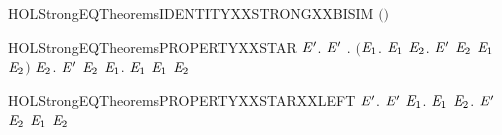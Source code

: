 \newcommand{\HOLStrongEQTheoremsEQUALXXIMPXXSTRONGXXEQUIV}{\UseVerbatim{HOLStrongEQTheoremsEQUALXXIMPXXSTRONGXXEQUIV}}
\begin{SaveVerbatim}{HOLStrongEQTheoremsIDENTITYXXSTRONGXXBISIM}
\HOLTokenTurnstile{}  \ensuremath{(}\HOLSymConst{\ensuremath{=}}\ensuremath{)}
\end{SaveVerbatim}
\newcommand{\HOLStrongEQTheoremsIDENTITYXXSTRONGXXBISIM}{\UseVerbatim{HOLStrongEQTheoremsIDENTITYXXSTRONGXXBISIM}}
\begin{SaveVerbatim}{HOLStrongEQTheoremsPROPERTYXXSTAR}
\HOLTokenTurnstile{} \HOLSymConst{\HOLTokenForall{}} \ensuremath{\HOLBoundVar{E}\sp{\prime}}.
         \ensuremath{\HOLBoundVar{E}\sp{\prime}} \HOLSymConst{\HOLTokenEquiv{}}
       \HOLSymConst{\HOLTokenForall{}}.
           \ensuremath{(}\HOLSymConst{\HOLTokenForall{}}\ensuremath{\HOLBoundVar{E}\sb{\mathrm{1}}}.  \HOLTokenTransBegin{}\HOLTokenTransEnd \ensuremath{\HOLBoundVar{E}\sb{\mathrm{1}}} \HOLSymConst{\HOLTokenImp{}} \HOLSymConst{\HOLTokenExists{}}\ensuremath{\HOLBoundVar{E}\sb{\mathrm{2}}}. \ensuremath{\HOLBoundVar{E}\sp{\prime}} \HOLTokenTransBegin{}\HOLTokenTransEnd \ensuremath{\HOLBoundVar{E}\sb{\mathrm{2}}} \HOLSymConst{\HOLTokenConj{}}  \ensuremath{\HOLBoundVar{E}\sb{\mathrm{1}}} \ensuremath{\HOLBoundVar{E}\sb{\mathrm{2}}}\ensuremath{)} \HOLSymConst{\HOLTokenConj{}}
           \HOLSymConst{\HOLTokenForall{}}\ensuremath{\HOLBoundVar{E}\sb{\mathrm{2}}}. \ensuremath{\HOLBoundVar{E}\sp{\prime}} \HOLTokenTransBegin{}\HOLTokenTransEnd \ensuremath{\HOLBoundVar{E}\sb{\mathrm{2}}} \HOLSymConst{\HOLTokenImp{}} \HOLSymConst{\HOLTokenExists{}}\ensuremath{\HOLBoundVar{E}\sb{\mathrm{1}}}.  \HOLTokenTransBegin{}\HOLTokenTransEnd \ensuremath{\HOLBoundVar{E}\sb{\mathrm{1}}} \HOLSymConst{\HOLTokenConj{}}  \ensuremath{\HOLBoundVar{E}\sb{\mathrm{1}}} \ensuremath{\HOLBoundVar{E}\sb{\mathrm{2}}}
\end{SaveVerbatim}
\newcommand{\HOLStrongEQTheoremsPROPERTYXXSTAR}{\UseVerbatim{HOLStrongEQTheoremsPROPERTYXXSTAR}}
\begin{SaveVerbatim}{HOLStrongEQTheoremsPROPERTYXXSTARXXLEFT}
\HOLTokenTurnstile{} \HOLSymConst{\HOLTokenForall{}} \ensuremath{\HOLBoundVar{E}\sp{\prime}}.
         \ensuremath{\HOLBoundVar{E}\sp{\prime}} \HOLSymConst{\HOLTokenImp{}}
       \HOLSymConst{\HOLTokenForall{}} \ensuremath{\HOLBoundVar{E}\sb{\mathrm{1}}}.  \HOLTokenTransBegin{}\HOLTokenTransEnd \ensuremath{\HOLBoundVar{E}\sb{\mathrm{1}}} \HOLSymConst{\HOLTokenImp{}} \HOLSymConst{\HOLTokenExists{}}\ensuremath{\HOLBoundVar{E}\sb{\mathrm{2}}}. \ensuremath{\HOLBoundVar{E}\sp{\prime}} \HOLTokenTransBegin{}\HOLTokenTransEnd \ensuremath{\HOLBoundVar{E}\sb{\mathrm{2}}} \HOLSymConst{\HOLTokenConj{}}  \ensuremath{\HOLBoundVar{E}\sb{\mathrm{1}}} \ensuremath{\HOLBoundVar{E}\sb{\mathrm{2}}}
\end{SaveVerbatim}
